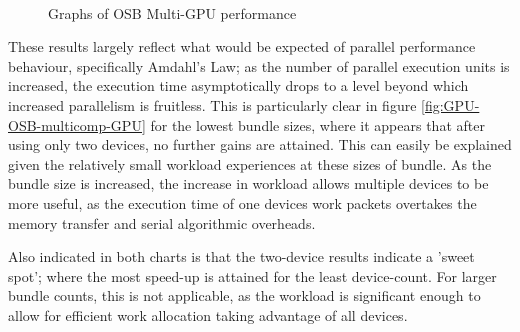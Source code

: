 \begin{figure}[h!]
  \centering
  \\
  \caption{Graphs of OSB Multi-GPU performance}
  \label{fig:GPU-OSB-multicomp}
\end{figure}

These results largely reflect what would be expected of parallel performance behaviour, specifically Amdahl's Law; as the number of parallel execution units is increased, the execution time asymptotically drops to a level beyond which increased parallelism is fruitless. This is particularly clear in figure \ref{fig:GPU-OSB-multicomp-GPU} for the lowest bundle sizes, where it appears that after using only two devices, no further gains are attained. This can easily be explained given the relatively small workload experiences at these sizes of bundle. As the bundle size is increased, the increase in workload allows multiple devices to be more useful, as the execution time of one devices work packets overtakes the memory transfer and serial algorithmic overheads.

Also indicated in both charts is that the two-device results indicate a 'sweet spot'; where the most speed-up is attained for the least device-count. For larger bundle counts, this is not applicable, as the workload is significant enough to allow for efficient work allocation taking advantage of all devices.

